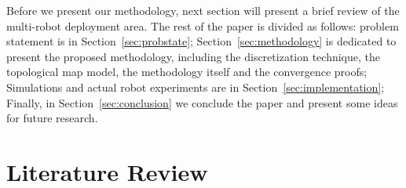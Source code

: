 \documentclass[smallcondensed]{svjour3}
\begin{document}
Before we present our methodology, next section will present a brief review of the multi-robot deployment area. The rest of the paper is divided as follows: problem statement is in Section~\ref{sec:probstate}; Section~\ref{sec:methodology} is dedicated to present the proposed methodology, including the discretization technique, the topological map model, the methodology itself and the convergence proofs; Simulations and actual robot experiments are in Section~\ref{sec:implementation}; Finally, in Section~\ref{sec:conclusion} we conclude the paper and present some ideas for future research.

\section{Literature Review}

\end{document}
